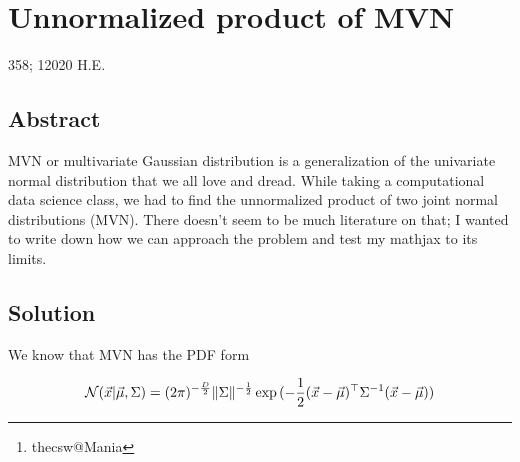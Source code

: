 \documentclass[12pt]{article}
\author{Sandy Urazayev\thanks{thecsw@Mania}}
\date{\today}
\title{}
\DeclarePairedDelimiter{\norm}{\lVert}{\rVert}
\def\x{\vec x }
\def\vmu{\vec \mu}
\begin{document}
\section*{Unnormalized product of MVN}
\label{sec:orgc9b88f5}

358; 12020 H.E.

\subsection*{Abstract}
\label{sec:org2f32d9f}

MVN or multivariate Gaussian distribution is a generalization of the
univariate normal distribution that we all love and dread. While taking a
computational data science class, we had to find the unnormalized product of
two joint normal distributions (MVN). There doesn't seem to be much
literature on that; I wanted to write down how we can approach the problem
and test my mathjax to its limits.  

\subsection*{Solution}
\label{sec:orgc4f58ba}

We know that MVN has the PDF form

\begin{equation}
\mathcal{N}(\x | \vmu, \Sigma) = (2\pi)^{-\frac{D}{2}} \norm{\Sigma}^{-\frac{1}{2}} \exp{(-\frac{1}{2}   (\x - \vmu)^{\top} \Sigma^{-1} (\x - \vmu))}
\end{equation}
\end{document}
